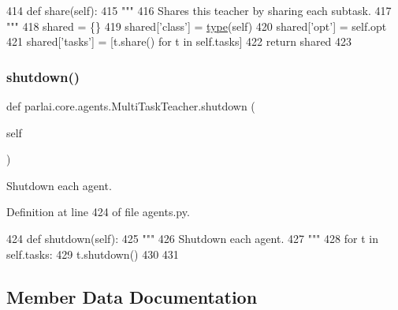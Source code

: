 \begin{DoxyCode}
414     \textcolor{keyword}{def }share(self):
415         \textcolor{stringliteral}{"""}
416 \textcolor{stringliteral}{        Shares this teacher by sharing each subtask.}
417 \textcolor{stringliteral}{        """}
418         shared = \{\}
419         shared[\textcolor{stringliteral}{'class'}] = \hyperlink{namespaceparlai_1_1agents_1_1tfidf__retriever_1_1build__tfidf_ad5dfae268e23f506da084a9efb72f619}{type}(self)
420         shared[\textcolor{stringliteral}{'opt'}] = self.opt
421         shared[\textcolor{stringliteral}{'tasks'}] = [t.share() \textcolor{keywordflow}{for} t \textcolor{keywordflow}{in} self.tasks]
422         \textcolor{keywordflow}{return} shared
423 
\end{DoxyCode}
\mbox{\label{classparlai_1_1core_1_1agents_1_1MultiTaskTeacher_a259dd3bec3f24669e835d8fbac657c3b}} 
\subsubsection{\texorpdfstring{shutdown()}{shutdown()}}
{\footnotesize\ttfamily def parlai.\+core.\+agents.\+Multi\+Task\+Teacher.\+shutdown (\begin{DoxyParamCaption}\item[{}]{self }\end{DoxyParamCaption})}

\begin{DoxyVerb}Shutdown each agent.
\end{DoxyVerb}
 

Definition at line 424 of file agents.\+py.


\begin{DoxyCode}
424     \textcolor{keyword}{def }shutdown(self):
425         \textcolor{stringliteral}{"""}
426 \textcolor{stringliteral}{        Shutdown each agent.}
427 \textcolor{stringliteral}{        """}
428         \textcolor{keywordflow}{for} t \textcolor{keywordflow}{in} self.tasks:
429             t.shutdown()
430 
431 
\end{DoxyCode}


\subsection{Member Data Documentation}
\mbox{\label{classparlai_1_1core_1_1agents_1_1MultiTaskTeacher_a1060c15dbbbe7fedfb89ba94969c5b99}} 
